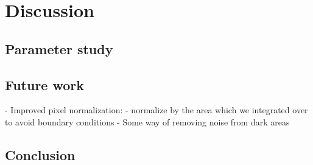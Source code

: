 \documentclass[thesis.tex]{subfiles}
\begin{document}
\chapter{Discussion}

\section{Parameter study}
\label{sec:odParameterStudy}


\section{Future work}
- Improved pixel normalization:
	- normalize by the area which we integrated over to avoid boundary conditions
	- Some way of removing noise from dark areas


\section{Conclusion}

\subbibliography
\end{document}
